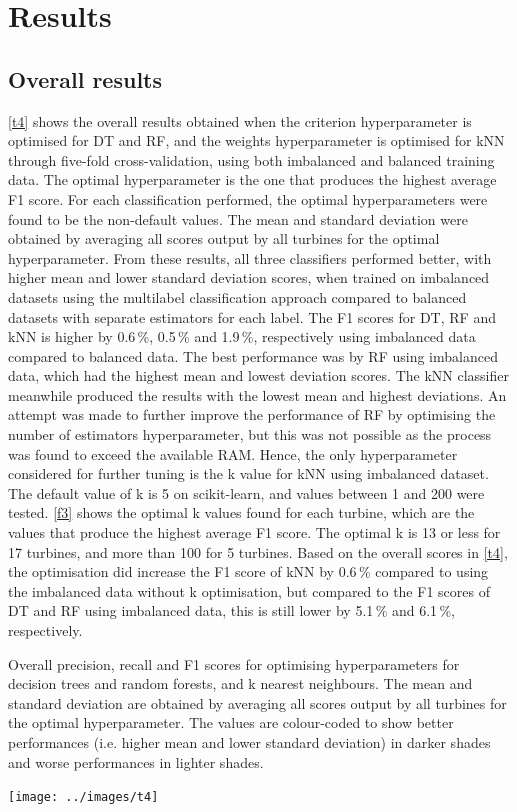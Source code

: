 \chapter{Results}\label{c3}

\section{Overall results}

\autoref{t4} shows the overall results obtained when the criterion
hyperparameter is optimised for DT and RF, and the weights hyperparameter is
optimised for kNN through five-fold cross-validation, using both imbalanced
and balanced training data. The optimal hyperparameter is the one that
produces the highest average F1 score. For each classification performed, the
optimal hyperparameters were found to be the non-default values. The mean and
standard deviation were obtained by averaging all scores output by all
turbines for the optimal hyperparameter. From these results, all three
classifiers performed better, with higher mean and lower standard deviation
scores, when trained on imbalanced datasets using the multilabel
classification approach compared to balanced datasets with separate estimators
for each label. The F1 scores for DT, RF and kNN is higher by 0.6\,\%, 0.5\,\%
and 1.9\,\%, respectively using imbalanced data compared to balanced data. The
best performance was by RF using imbalanced data, which had the highest mean
and lowest deviation scores. The kNN classifier meanwhile produced the results
with the lowest mean and highest deviations. An attempt was made to further
improve the performance of RF by optimising the number of estimators
hyperparameter, but this was not possible as the process was found to exceed
the available RAM. Hence, the only hyperparameter considered for further
tuning is the k value for kNN using imbalanced dataset. The default value of k
is 5 on scikit-learn, and values between 1 and 200 were tested. \autoref{f3}
shows the optimal k values found for each turbine, which are the values that
produce the highest average F1 score. The optimal k is 13 or less for 17
turbines, and more than 100 for 5 turbines. Based on the overall scores in
\autoref{t4}, the optimisation did increase the F1 score of kNN by 0.6\,\%
compared to using the imbalanced data without k optimisation, but compared to
the F1 scores of DT and RF using imbalanced data, this is still lower by
5.1\,\% and 6.1\,\%, respectively.

\begin{table}
  \centering
  \caption{\label{t4}Overall precision, recall and F1 scores for optimising
  hyperparameters for decision trees and random forests, and k nearest
  neighbours. The mean and standard deviation are obtained by averaging all
  scores output by all turbines for the optimal hyperparameter. The values are
  colour-coded to show better performances (i.e. higher mean and lower
  standard deviation) in darker shades and worse performances in lighter
  shades.}
  \texttt{[image: ../images/t4]}
\end{table}

